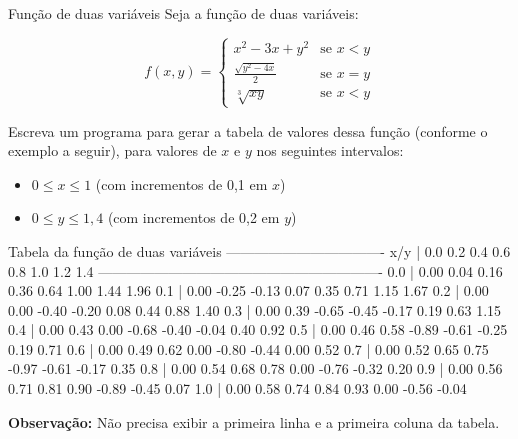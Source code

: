 \documentclass[11pt,fleqn]{practice}
\begin{document}
\begin{task}[breakable]{Função de duas variáveis}{}
  Seja a função de duas variáveis:

  \[ 
  f(x,y) =
    \begin{cases}
      x^2 - 3x + y^2  & \text{se $x < y$}\\
      \frac{\sqrt{y^2 - 4x}}{2}  & \text{se $x = y$}\\
      \sqrt[3]{xy}  & \text{se $x < y$}
    \end{cases}
  \]

  Escreva um programa para gerar a tabela de valores dessa função
  (conforme o exemplo a seguir), para valores de $x$ e $y$ nos seguintes
  intervalos:
  \begin{itemize}
    \item $0 \leq x \leq 1$ (com incrementos de 0,1 em $x$)
    \item $0 \leq y \leq 1,4$ (com incrementos de 0,2 em $y$)
  \end{itemize}

  \begin{runexample}
Tabela da função de duas variáveis
----------------------------------
x/y |    0.0    0.2    0.4    0.6    0.8    1.0    1.2    1.4
-------------------------------------------------------------
0.0 |   0.00   0.04   0.16   0.36   0.64   1.00   1.44   1.96
0.1 |   0.00  -0.25  -0.13   0.07   0.35   0.71   1.15   1.67
0.2 |   0.00   0.00  -0.40  -0.20   0.08   0.44   0.88   1.40
0.3 |   0.00   0.39  -0.65  -0.45  -0.17   0.19   0.63   1.15
0.4 |   0.00   0.43   0.00  -0.68  -0.40  -0.04   0.40   0.92
0.5 |   0.00   0.46   0.58  -0.89  -0.61  -0.25   0.19   0.71
0.6 |   0.00   0.49   0.62   0.00  -0.80  -0.44   0.00   0.52
0.7 |   0.00   0.52   0.65   0.75  -0.97  -0.61  -0.17   0.35
0.8 |   0.00   0.54   0.68   0.78   0.00  -0.76  -0.32   0.20
0.9 |   0.00   0.56   0.71   0.81   0.90  -0.89  -0.45   0.07
1.0 |   0.00   0.58   0.74   0.84   0.93   0.00  -0.56  -0.04
  \end{runexample}

  \textbf{Observação:} Não precisa exibir a primeira linha e a primeira
  coluna da tabela.

  \tcblower
  \solution
\end{task}
\end{document}
